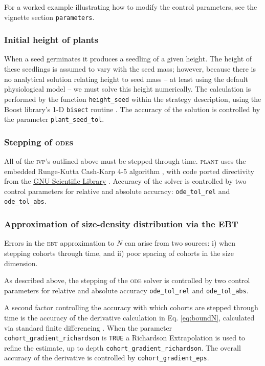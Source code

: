 \documentclass[10pt,twoside]{article}
\newcommand{\plant}{\textsc{plant}}
\begin{document}
For a worked example illustrating how to modify the control parameters,
see the vignette section \texttt{parameters}.

\subsubsection{Initial height of plants}\label{initial-height-of-plants}

When a seed germinates it produces a seedling of a given height. The
height of these seedlings is assumed to vary with the seed mass;
however, because there is no analytical solution relating height to seed
mass -- at least using the default physiological model -- we must solve
this height numerically. The calculation is performed by the function
\texttt{height\_seed} within the strategy description, using the Boost
library's 1-D \texttt{bisect} routine
\citep{Schaling-2014, Eddelbuettel-2015}. The accuracy of the solution
is controlled by the parameter \texttt{plant\_seed\_tol}.

\subsubsection{Stepping of \textsc{ode}s}

All of the \textsc{ivp}'s outlined above must be stepped through time.
{\plant} uses
the embedded Runge-Kutta Cash-Karp 4-5 algorithm \citep{Cash-1990}, with
code ported directivity from the
\href{http://www.gnu.org/software/gsl/}{GNU Scientific Library}
\citep{Galassi-2009}. Accuracy of the solver is controlled by two
control parameters for relative and absolute accuracy:
\texttt{ode\_tol\_rel} and \texttt{ode\_tol\_abs}.

\subsubsection{Approximation of size-density distribution via the EBT}
\label{approximation-of-size-density-distribution-via-the-ebt}

Errors in the \textsc{ebt} approximation to \(N\) can arise from two sources:
i) when stepping cohorts through time, and
ii) poor spacing of cohorts in the size dimension.

As described above, the stepping of the \textsc{ode} solver is controlled by two
control parameters for relative and absolute accuracy
\texttt{ode\_tol\_rel} and \texttt{ode\_tol\_abs}.

A second factor controlling the accuracy with which cohorts are stepped
through time is the accuracy of the derivative calculation in Eq.
\ref{eq:boundN}, calculated via standard finite differencing
\citep{Abramowitz-2012}. When the parameter
\texttt{cohort\_gradient\_richardson} is \texttt{TRUE} a Richardson Extrapolation
\citep{Stoer-2002} is used to refine the estimate, up to depth
\texttt{cohort\_gradient\_richardson}. The overall accuracy of the
derivative is controlled by \texttt{cohort\_gradient\_eps}.
\end{document}
